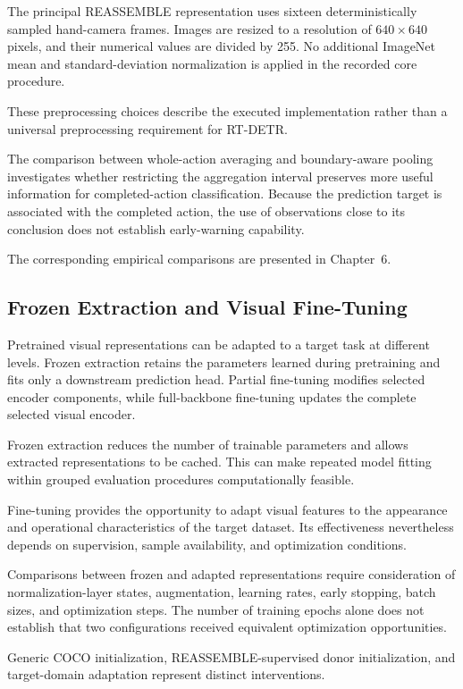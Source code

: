 The principal REASSEMBLE representation uses sixteen deterministically sampled hand-camera frames. Images are resized to a resolution of \(640 \times 640\) pixels, and their numerical values are divided by 255. No additional ImageNet mean and standard-deviation normalization is applied in the recorded core procedure.

These preprocessing choices describe the executed implementation rather than a universal preprocessing requirement for RT-DETR.

The comparison between whole-action averaging and boundary-aware pooling investigates whether restricting the aggregation interval preserves more useful information for completed-action classification. Because the prediction target is associated with the completed action, the use of observations close to its conclusion does not establish early-warning capability.

The corresponding empirical comparisons are presented in Chapter~6.

\subsection{Frozen Extraction and Visual Fine-Tuning}

Pretrained visual representations can be adapted to a target task at different levels. Frozen extraction retains the parameters learned during pretraining and fits only a downstream prediction head. Partial fine-tuning modifies selected encoder components, while full-backbone fine-tuning updates the complete selected visual encoder.

Frozen extraction reduces the number of trainable parameters and allows extracted representations to be cached. This can make repeated model fitting within grouped evaluation procedures computationally feasible.

Fine-tuning provides the opportunity to adapt visual features to the appearance and operational characteristics of the target dataset. Its effectiveness nevertheless depends on supervision, sample availability, and optimization conditions.

Comparisons between frozen and adapted representations require consideration of normalization-layer states, augmentation, learning rates, early stopping, batch sizes, and optimization steps. The number of training epochs alone does not establish that two configurations received equivalent optimization opportunities.

Generic COCO initialization, REASSEMBLE-supervised donor initialization, and target-domain adaptation represent distinct interventions.

